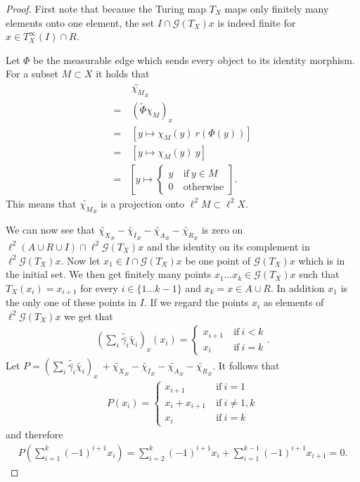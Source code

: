 \documentclass[12pt,a4paper]{scrartcl}
\theoremstyle{plain}
\theoremstyle{definition}
\numberwithin{equation}{section}
\newcommand{\2}{\mathbb{Z} / 2 \mathbb{Z}}
\newcommand{\G}{\mathcal{G}}
\newcommand{\1}{\bar{1}}
\newcommand{\0}{\bar{0}}
\begin{document}
\begin{proof}
	First note that because the Turing map $T_X$ maps only finitely many elements onto one element, the set $I \cap \G (T_X)x$ is indeed finite for $x \in T_X^\infty(I) \cap R$.
	 
	Let $\Phi$ be the measurable edge which sends every object to its identity morphism. For a subset $M \subset X$ it holds that
	\begin{align*}
		 &~ \tilde{\chi_M}_x \\
		=&~ (\tilde{\Phi}\chi_{M})_x \\
		=&~ [y \mapsto \chi_{M}(y) ~ r(\Phi(y))] \\
		=&~ [y \mapsto \chi_{M}(y) ~ y] \\
		=& \left[y \mapsto \begin{cases}
			y &~ \text{if} ~ y \in M \\
			0 &~ \text{otherwise}
		\end{cases}\right].
	\end{align*}
	This means that $\tilde{\chi_M}_x$ is a projection onto $\ell^2M \subset \ell^2 X$.
	
	We can now see that $\tilde{\chi_X}_x - \tilde{\chi_I}_x - \tilde{\chi_A}_x - \tilde{\chi_R}_x$ is zero on $\ell^2(A \cup R \cup I) \cap \ell^2 \G (T_X)x$ and the identity on its complement in $\ell^2 \G (T_X)x$. Now let $x_1 \in I \cap \G (T_X)x$ be  one point of $\G (T_X)x$ which is in the initial set. We then get finitely many points $x_1 \ldots x_k \in \G (T_X)x$ such that $T_X(x_i) = x_{i + 1}$ for every $i \in \{1 \ldots k - 1\}$ and $x_k = x \in A \cup R$. In addition $x_1$ is the only one of these points in $I$. If we regard the points $x_i$ as elements of $\ell^2 \G (T_X)x$ we get that 
	\begin{align*}
		(\sum_{i} \tilde{\bar{\gamma_i}} \tilde{\chi_i})_x(x_i) =\begin{cases}
		x_{i+1} &~ \text{if} ~ i < k \\
		x_i &~ \text{if} ~ i = k
		\end{cases}.
	\end{align*}
	Let $P = (\sum_{i} \tilde{\bar{\gamma_i}} \tilde{\chi_i})_x \ + \tilde{\chi_X}_x - \tilde{\chi_I}_x - \tilde{\chi_A}_x - \tilde{\chi_R}_x$. It follows that
	\begin{align*}
		P(x_i) = \begin{cases}
		x_{i + 1} &~ \text{if} ~ i = 1 \\
		x_{i} + x_{i + 1} &~ \text{if} ~ i \neq 1, k \\
		x_{i} &~ \text{if} ~ i = k
		\end{cases}
	\end{align*}
	and therefore 
	\begin{align*}
		P(\sum_{i = 1}^{k} (-1)^{i + 1} x_i) =\sum_{i = 2}^{k} (-1)^{i+1} x_{i} + \sum_{i = 1}^{k-1} (-1)^{i+1} x_{i+1} = 0.
	\end{align*}
	

\end{proof}
\end{document}
